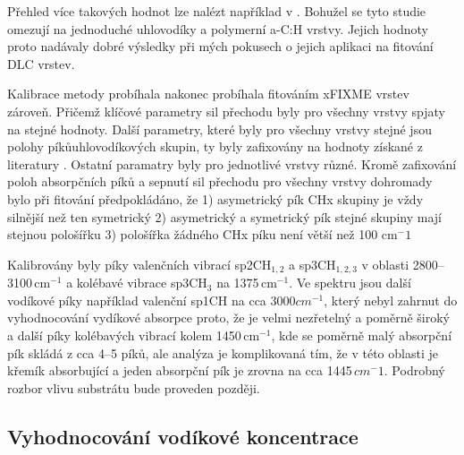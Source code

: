 Přehled více takových hodnot lze nalézt například v \cite{Heitz1998}. Bohužel se tyto studie omezují na jednoduché uhlovodíky a polymerní a-C:H vrstvy. Jejich hodnoty proto nadávaly dobré výsledky při mých pokusech o jejich aplikaci na fitování DLC vrstev. 

Kalibrace metody probíhala nakonec probíhala fitováním xFIXME vrstev zároveň. Přičemž klíčové parametry sil přechodu byly pro všechny vrstvy spjaty na stejné hodnoty. Další parametry, které byly pro všechny vrstvy stejné jsou polohy píkůuhlovodíkových skupin, ty byly zafixovány na hodnoty získané z literatury \cite{Robertson2002, Dischler1983, Ristein1998, Zajickova2011}. Ostatní paramatry byly pro jednotlivé vrstvy různé.
Kromě zafixování poloh absorpčních píků a sepnutí sil přechodu pro všechny vrstvy dohromady bylo při fitování předpokládáno, že 
1) asymetrický pík CHx skupiny je vždy silnější než ten symetrický
2) asymetrický a symetrický pík stejné skupiny mají stejnou pološířku
3) pološířka žádného CHx píku není větší než 100 cm$^-1$

Kalibrovány byly píky valenčních vibrací sp2CH$_{1,2}$ a sp3CH$_{1,2,3}$ v oblasti 2800--3100\,cm$^{-1}$ a kolébavé vibrace sp3CH$_3$ na 1375\,cm$^{-1}$. Ve spektru jsou další vodíkové píky například valenční sp1CH na cca 3000$cm^{-1}$, který nebyl zahrnut do vyhodnocování vydíkové absorpce proto, že je velmi nezřetelný a poměrně široký a další píky kolébavých vibrací kolem 1450\,cm$^{-1}$, kde se poměrně malý absorpční pík skládá z cca 4--5 píků, ale analýza je komplikovaná tím, že v této oblasti je křemík absorbující a jeden absorpční pík je zrovna na cca 1445\,$cm^-1$. Podrobný rozbor vlivu substrátu bude proveden později.

\subsection{Vyhodnocování vodíkové koncentrace}

\cleardoublepage
